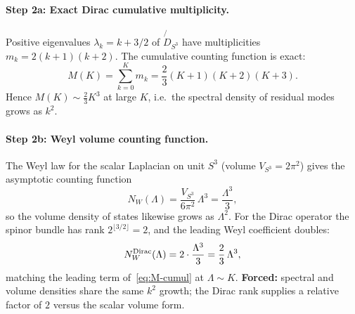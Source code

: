 \documentclass[11pt,a4paper]{article}
\begin{document}
\paragraph{Step 2a: Exact Dirac cumulative multiplicity.}
Positive eigenvalues \(\lambda_k=k+3/2\) of \(\not{D}_{S^3}\) have multiplicities \(m_k=2(k+1)(k+2)\). The cumulative counting function is exact:
\begin{equation}
M(K)=\sum_{k=0}^{K}m_k=\frac23(K+1)(K+2)(K+3).
\label{eq:M-cumul}
\end{equation}
Hence \(M(K)\sim\tfrac23 K^3\) at large \(K\), i.e.\ the spectral density of residual modes grows as \(k^2\).

\paragraph{Step 2b: Weyl volume counting function.}
The Weyl law for the scalar Laplacian on unit \(S^3\) (volume \(V_{S^3}=2\pi^2\)) gives the asymptotic counting function
\begin{equation}
N_W(\Lambda)=\frac{V_{S^3}}{6\pi^2}\,\Lambda^3=\frac{\Lambda^3}{3},
\label{eq:Weyl}
\end{equation}
so the volume density of states likewise grows as \(\Lambda^2\). For the Dirac operator the spinor bundle has rank \(2^{\lfloor 3/2\rfloor}=2\), and the leading Weyl coefficient doubles:
\begin{equation}
N_W^{\rm Dirac}(\Lambda)=2\cdot\frac{\Lambda^3}{3}=\frac{2}{3}\,\Lambda^3,
\label{eq:Weyl-Dirac}
\end{equation}
matching the leading term of~\eqref{eq:M-cumul} at \(\Lambda\sim K\). \textbf{Forced:} spectral and volume densities share the same \(k^2\) growth; the Dirac rank supplies a relative factor of \(2\) versus the scalar volume form.
\end{document}
